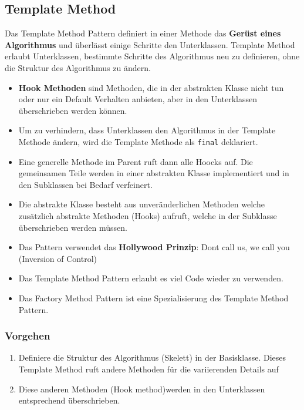 \subsection{Template Method}
\label{sec:templatemethod}
Das Template Method Pattern definiert in einer Methode das \textbf{Gerüst eines Algorithmus} und überlässt einige Schritte den Unterklassen. Template Method erlaubt Unterklassen, bestimmte Schritte des Algorithmus neu zu definieren, ohne die Struktur des Algorithmus zu ändern.
\begin{itemize}
	\item \textbf{Hook Methoden} sind Methoden, die in der abstrakten Klasse nicht tun oder nur ein Default Verhalten anbieten, aber in den Unterklassen überschrieben werden können.
	\item Um zu verhindern, dass Unterklassen den Algorithmus in der Template Methode ändern, wird die Template Methode als \lstinline|final| deklariert.
	\item Eine generelle Methode im Parent ruft dann alle Hoocks auf. Die gemeinsamen Teile werden in einer abstrakten Klasse implementiert und in den Subklassen bei Bedarf verfeinert.
	\item Die abstrakte Klasse besteht aus unveränderlichen Methoden welche zusätzlich abstrakte Methoden (Hooks) aufruft, welche in der Subklasse überschrieben werden müssen.
	\item Das Pattern verwendet das \textbf{Hollywood Prinzip}: Dont call us, we call you (Inversion of Control)
	\item Das Template Method Pattern erlaubt es viel Code wieder zu verwenden.
	\item Das Factory Method Pattern ist eine Spezialisierung des Template Method Pattern.
\end{itemize}

\subsubsection{Vorgehen}
\begin{enumerate}
	\item Definiere die Struktur des Algorithmus (Skelett) in der Basisklasse. Dieses Template Method ruft andere Methoden für die variierenden Details auf
	\item Diese anderen Methoden (Hook method)werden in den Unterklassen entsprechend überschrieben.
\end{enumerate}

